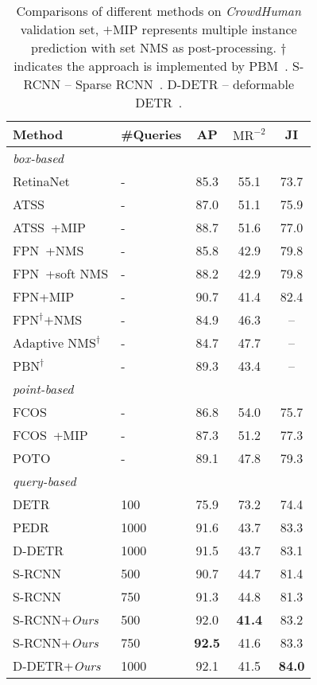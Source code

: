 \documentclass[final]{cvpr}
\begin{document}
\begin{table}[ht]
	\centering
	\begin{tabular}{llccc}
		\toprule
		Method & \#Queries & AP & $\text{MR}^{-2}$  & JI \\
		\hline
		\hline
		\textit{box-based} \\
		RetinaNet~\cite{lin2020focal} & - & 85.3 & 55.1 & 73.7 \\
		ATSS~\cite{2020atss} & - & 87.0 & 51.1 & 75.9 \\
        ATSS~\cite{2020atss}+$\text{MIP}$~\cite{chu2020detection} & - & 88.7 & 51.6 & 77.0 \\
		FPN~\cite{lin2017feature}+NMS & - & 85.8 & 42.9 & 79.8 \\
		FPN~\cite{lin2017feature}+soft NMS & - & 88.2 & 42.9 & 79.8 \\
		FPN+MIP~\cite{chu2020detection} & - & 90.7 & 41.4 & 82.4 \\
		\hline
	    ${\text{FPN}}^{\dag}\text{+NMS}$ & - & 84.9 & 46.3 & -- \\
	    ${\text{Adaptive NMS}}^{\dag}$~\cite{liu2019adaptive} & - & 84.7 & 47.7 & -- \\
	    ${\text{PBN}^{\dag}}$~\cite{huang2020nms} & - & 89.3 & 43.4 & -- \\
		\hline
		\hline
		\textit{point-based} \\
		FCOS~\cite{tian2021fcos} & - & 86.8 & 54.0 & 75.7 \\
		FCOS~\cite{tian2021fcos}+$\text{MIP}$~\cite{chu2020detection} & - & 87.3 & 51.2 & 77.3 \\
		POTO~\cite{wang2020end} & - & 89.1 & 47.8 & 79.3 \\
		\hline
		\hline
		\textit{query-based} \\
		DETR~\cite{carion2020end} & 100 & 75.9 & 73.2 & 74.4 \\
		PEDR \cite{lin2020detr} & 1000 & 91.6 & 43.7 & 83.3 \\
		D-DETR \cite{zhu2021deformable} & 1000 & 91.5 & 43.7 & 83.1 \\
		S-RCNN~\cite{sun2020sparse} & 500 & 90.7 & 44.7 & 81.4 \\
		S-RCNN~\cite{sun2020sparse} & 750 & 91.3 & 44.8 & 81.3 \\
		\hline
		S-RCNN+\emph{Ours} & 500 & 92.0 & \textbf{41.4} & 83.2 \\
		S-RCNN+\emph{Ours} & 750 & \textbf{92.5} & 41.6 & 83.3 \\
		D-DETR+\emph{Ours} & 1000 & 92.1 & 41.5 & \textbf{84.0} \\
		\bottomrule
	\end{tabular}
	\caption{Comparisons of different methods on \emph{CrowdHuman} validation set, $\text{+MIP}$ represents multiple instance prediction with set NMS as post-processing. ${\dag}$ indicates the approach is implemented by PBM~\cite{huang2020nms}. S-RCNN -- Sparse RCNN~\cite{sun2020sparse}. D-DETR -- deformable DETR~\cite{zhu2021deformable}.}
	\label{tbl:sota}
	\vspace{-1pc}
\end{table}
\end{document}
